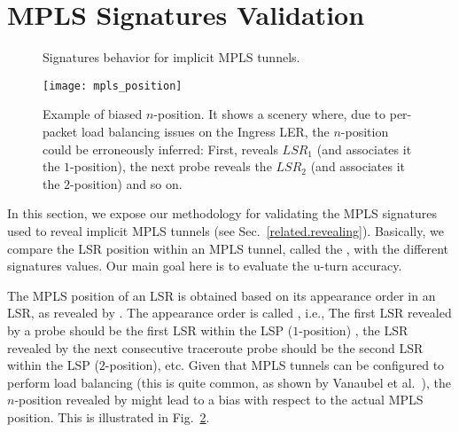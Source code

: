 \section{MPLS Signatures Validation}\label{validation}
\begin{figure}[!t]
  \begin{center}
\hspace{-0.3cm}      
  \end{center}
\vspace{-0.5cm}  
  \caption{Signatures behavior for implicit MPLS tunnels.}
  \label{validation.signatures.fig}
\end{figure}

\begin{figure}[!t]
  \begin{center}
    \texttt{[image: mpls\_position]}
  \end{center}
\vspace{-0.5cm}  
  \caption{Example of biased $n$-position. 
  It shows a scenery where, due to per-packet load balancing issues on the
  Ingress LER, the $n$-position could be erroneously inferred: First,
  \traceroute reveals  $LSR_{1}$ (and associates it the $1$-position), the next
  \traceroute probe reveals the $LSR_{2}$ (and associates it the $2$-position)
  and so on.}
  \label{validation.MPLSpositionFig}
\end{figure}

In this section, we expose our methodology for validating the MPLS signatures
used to reveal implicit MPLS tunnels (see Sec.~\ref{related.revealing}).
Basically, we compare the LSR position within an MPLS tunnel, called the
, with the different signatures values. Our main goal here is
to evaluate the u-turn accuracy.

The MPLS position of an LSR is obtained based on its appearance order in an LSR,
as revealed by \traceroute.  The appearance order is called ,
i.e., The first LSR revealed by a \traceroute probe should be the first LSR
within the LSP ($1$-position) , the LSR revealed by the next consecutive
traceroute probe should be the second LSR within the LSP ($2$-position), etc.
Given that MPLS tunnels can be configured to perform load balancing (this is
quite common, as shown by Vanaubel et al.~\cite{Vanaubel15}), the $n$-position
revealed by \traceroute might lead to a bias with respect to the actual MPLS
position. This is illustrated in Fig.~\ref{validation.MPLSpositionFig}.


